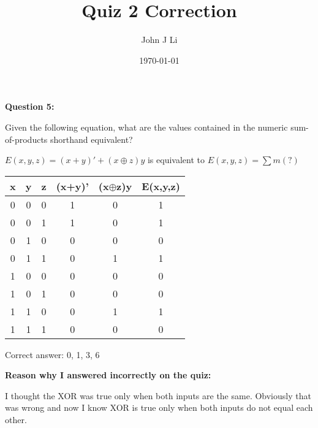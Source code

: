 \documentclass{article}
\title{Quiz 2 Correction}
\date{\today}
\author{John J Li}
\begin{document}
    \maketitle
    \newpage


    \textbf{Question 5:}

    Given the following equation, what are the values contained in the numeric sum-of-products
    shorthand equivalent?

    $E(x,y,z) = (x+y)' + (x\oplus z)y$ is equivalent to $E(x,y,z) = \sum m(?)$

    \begin{center}
        \begin{tabular} {ccc|c|c|c} 
            x & y & z & (x+y)' & (x$\oplus$z)y & E(x,y,z) \\
            \hline
            0 & 0 & 0 & 1 & 0 & 1 \\
            0 & 0 & 1 & 1 & 0 & 1 \\
            0 & 1 & 0 & 0 & 0 & 0 \\
            0 & 1 & 1 & 0 & 1 & 1 \\
            1 & 0 & 0 & 0 & 0 & 0 \\
            1 & 0 & 1 & 0 & 0 & 0 \\
            1 & 1 & 0 & 0 & 1 & 1 \\
            1 & 1 & 1 & 0 & 0 & 0 \\
        \end{tabular}
    \end{center}

    Correct answer: 0, 1, 3, 6

    \textbf{Reason why I answered incorrectly on the quiz:}

    I thought the XOR was true only when both inputs are the same. Obviously that was wrong
    and now I know XOR is true only when both inputs do not equal each other.
\end{document}
